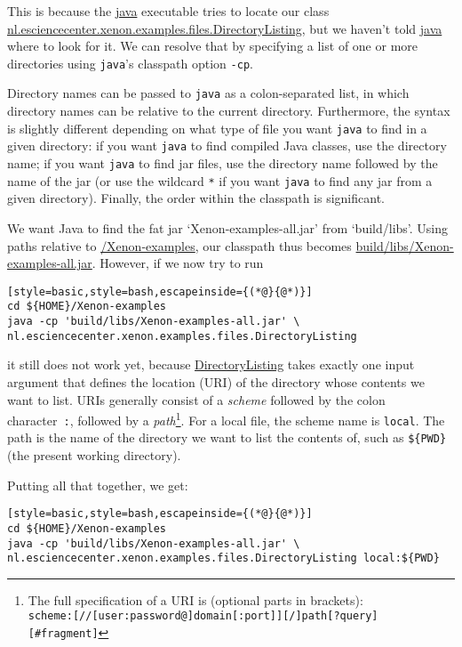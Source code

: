 This is because the \url{java} executable tries to locate our class \url{nl.esciencecenter.xenon.examples.files.DirectoryListing}, but we haven't told \url{java} where to look for it. We can resolve that by specifying a list of one or more directories using \texttt{java}'s classpath option \texttt{-cp}.

Directory names can be passed to \texttt{java} as a colon-separated list, in which directory names can be relative to the current directory. Furthermore, the syntax is slightly different depending on what type of file you want \texttt{java} to find in a given directory: if you want \texttt{java} to find compiled Java classes, use the directory name; if you want \texttt{java} to find jar files, use the directory name followed by the name of the jar (or use the wildcard \texttt{*} if you want \texttt{java} to find any jar from a given directory). Finally, the order within the classpath is significant.


We want Java to find the fat jar `Xenon-examples-all.jar' from `build/libs'. Using paths relative to \mytilde\url{/Xenon-examples}, our classpath thus becomes \url{build/libs/Xenon-examples-all.jar}. However, if we now try to run
\begin{lstlisting}[style=basic,style=bash,escapeinside={(*@}{@*)}]
cd ${HOME}/Xenon-examples
java -cp 'build/libs/Xenon-examples-all.jar' \
nl.esciencecenter.xenon.examples.files.DirectoryListing
\end{lstlisting}
it still does not work yet, because \url{DirectoryListing} takes exactly one input argument that defines the location (URI) of the directory whose contents we want to list. URIs generally consist of a \textit{scheme} followed by the colon character~\texttt{:}, followed by a \textit{path}\footnote{The full specification of a URI is (optional parts in brackets): \\ \texttt{scheme:[//[user:password@]domain[:port]][/]path[?query][#fragment]}\label{footnote:format-uri}}. For a local file, the scheme name is \texttt{local}. The path is the name of the directory we want to list the contents of, such as \texttt{\$\{PWD\}} (the present working directory).

Putting all that together, we get:

\begin{lstlisting}[style=basic,style=bash,escapeinside={(*@}{@*)}]
cd ${HOME}/Xenon-examples
java -cp 'build/libs/Xenon-examples-all.jar' \
nl.esciencecenter.xenon.examples.files.DirectoryListing local:${PWD}
\end{lstlisting} \label{snip:directory-listing-local}

